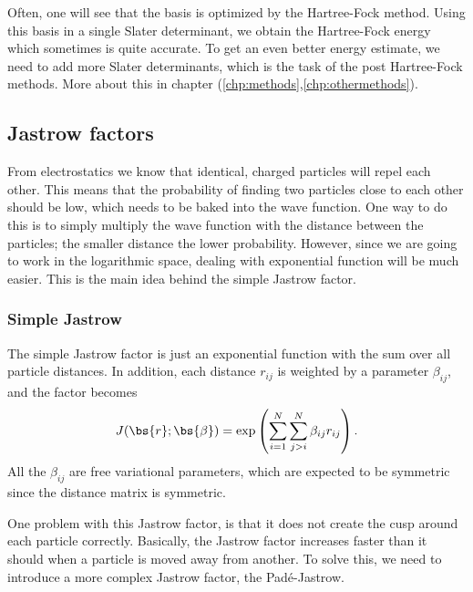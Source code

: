 Often, one will see that the basis is optimized by the Hartree-Fock method. Using this basis in a single Slater determinant, we obtain the Hartree-Fock energy which sometimes is quite accurate. To get an even better energy estimate, we need to add more Slater determinants, which is the task of the post Hartree-Fock methods. More about this in chapter (\ref{chp:methods},\ref{chp:othermethods}).

\subsection{Jastrow factors} \label{subsubsec:jastrow}
From electrostatics we know that identical, charged particles will repel each other. This means that the probability of finding two particles close to each other should be low, which needs to be baked into the wave function. One way to do this is to simply multiply the wave function with the distance between the particles; the smaller distance the lower probability. However, since we are going to work in the logarithmic space, dealing with exponential function will be much easier. This is the main idea behind the simple Jastrow factor.

\subsubsection{Simple Jastrow}
The simple Jastrow factor is just an exponential function with the sum over all particle distances. In addition, each distance $r_{ij}$ is weighted by a parameter $\beta_{ij}$, and the factor becomes
\begin{equation}
J(\bs{r}; \bs{\beta}) = \exp\left(\sum_{i=1}^N\sum_{j>i}^N{\beta_{ij}r_{ij}}\right).
\label{eq:SimpleJastrow}
\end{equation}
All the $\beta_{ij}$ are free variational parameters, which are expected to be symmetric since the distance matrix is symmetric.

One problem with this Jastrow factor, is that it does not create the cusp around each particle correctly. Basically, the Jastrow factor increases faster than it should when a particle is moved away from another. To solve this, we need to introduce a more complex Jastrow factor, the Padé-Jastrow.

